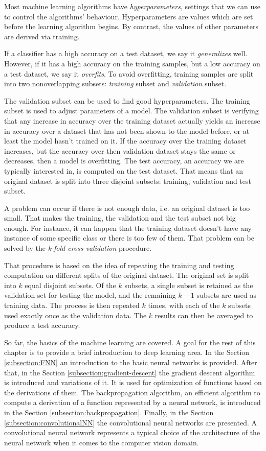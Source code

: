 Most machine learning algorithms have \textit{hyperparameters}, settings that we can use to control the algorithms' behaviour. Hyperparameters are values which are set before the learning algorithm begins. By contrast, the values of other parameters are derived via training. 

If a classifier has a high accuracy on a test dataset, we say it \textit{generalizes} well. However, if it has a high accuracy on the training samples, but a low accuracy on a test dataset, we say it \textit{overfits}. To avoid overfitting, training samples are split into two nonoverlapping subsets: \textit{training} subset and \textit{validation} subset.

The validation subset can be used to find good hyperparameters. The training subset is used to adjust parameters of a model. The validation subset is verifying that any increase in accuracy over the training dataset actually yields an increase in accuracy over a dataset that has not been shown to the model before, or at least the model hasn't trained on it. If the accuracy over the training dataset increases, but the accuracy over then validation dataset stays the same or decreases, then a model is overfitting. The test accuracy, an accuracy we are typically interested in, is computed on the test dataset. That means that an original dataset is split into three disjoint subsets: training, validation and test subset. 

A problem can occur if there is not enough data, i.e. an original dataset is too small. That makes the training, the validation and the test subset not big enough. For instance, it can happen that the training dataset doesn't have any instance of some specific class or there is too few of them. That problem can be solved by the \textit{k-fold cross-validation} procedure.

That procedure is based on the idea of repeating the training and testing computation on different splits of the original dataset. The original set is split into $k$ equal disjoint subsets. Of the $k$ subsets, a single subset is retained as the validation set for testing the model, and the remaining $k-1$ subsets are used as training data. The process is then repeated $k$ times, with each of the $k$ subsets used exactly once as the validation data. The $k$ results can then be averaged to produce a test accuracy. 

So far, the basics of the machine learning are covered. A goal for the rest of this chapter is to provide a brief introduction to deep learning area. In the Section \ref{subsection:FNN} an introduction to the basic neural networks is provided. After that, in the Section \ref{subsection:gradient-descent} the gradient descent algorithm is introduced and variations of it. It is used for optimization of functions based on the derivations of them. The backpropagation algorithm, an efficient algorithm to compute a derivation of a function represented by a neural network, is introduced in the Section \ref{subsection:backpropagation}. Finally, in the Section \ref{subsection:convolutionalNN} the convolutional neural networks are presented. A convolutional neural network represents a typical choice of the architecture of the neural network when it comes to the computer vision domain.

